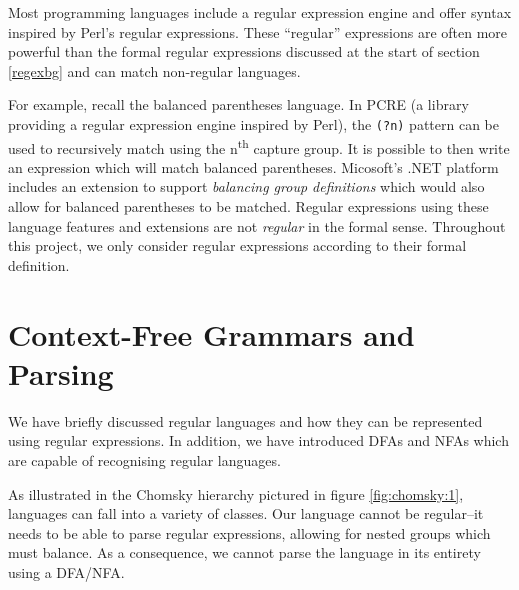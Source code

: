\documentclass[a4paper,openany,12pt]{book}
\begin{document}
Most programming languages include a regular expression engine and offer syntax inspired by Perl's regular expressions.
These ``regular'' expressions are often more powerful than the formal regular expressions discussed at the start of
section \ref{regexbg} and can match non-regular languages.

For example, recall the balanced parentheses language.
In PCRE (a library providing a regular expression engine inspired by Perl), the \texttt{(?n)} pattern can be used to
recursively match using the n\textsuperscript{th} capture group.
It is possible to then write an expression which will match balanced parentheses.
Micosoft's .NET platform includes an extension to support \emph{balancing group definitions} which would also allow for
balanced parentheses to be matched.
Regular expressions using these language features and extensions are not \emph{regular} in the formal sense.
Throughout this project, we only consider regular expressions according to their formal definition.

\section{Context-Free Grammars and Parsing}

We have briefly discussed regular languages and how they can be represented using regular expressions.
In addition, we have introduced DFAs and NFAs which are capable of recognising regular languages.

As illustrated in the Chomsky hierarchy pictured in figure \ref{fig:chomsky:1}, languages can fall into a variety of
classes.
Our language cannot be regular--it needs to be able to parse regular expressions, allowing for nested groups which must
balance.
As a consequence, we cannot parse the language in its entirety using a DFA/NFA.
\end{document}
